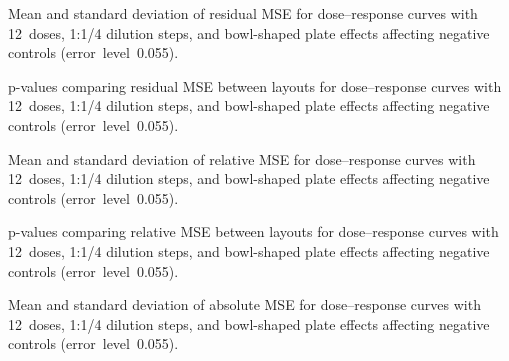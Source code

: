 \begin{table}[p]
    \centering
    \small
    
    \caption{Mean and standard deviation of residual MSE for dose--response curves with 12~doses, 1:1/4 dilution steps, and bowl-shaped plate effects affecting negative controls (error~level~0.055).}
    \label{tab:dr-residuals-mean-std-12doses-dil4-bowl-neg-controls-0.055}
\end{table}

\begin{table}[p]
    \centering
    \small
    
    \caption{p-values comparing residual MSE between layouts for dose--response curves with 12~doses, 1:1/4 dilution steps, and bowl-shaped plate effects affecting negative controls (error~level~0.055).}
    \label{tab:dr-residuals-pvalues-12doses-dil4-bowl-neg-controls-0.055}
\end{table}

\begin{table}[p]
    \centering
    \small
    
    \caption{Mean and standard deviation of relative \ECIC{} MSE for dose--response curves with 12~doses, 1:1/4 dilution steps, and bowl-shaped plate effects affecting negative controls (error~level~0.055).}
    \label{tab:dr-relic50-mean-std-12doses-dil4-bowl-neg-controls-0.055}
\end{table}

\begin{table}[p]
    \centering
    \small
    
    \caption{p-values comparing relative \ECIC{} MSE between layouts for dose--response curves with 12~doses, 1:1/4 dilution steps, and bowl-shaped plate effects affecting negative controls (error~level~0.055).}
    \label{tab:dr-relic50-pvalues-12doses-dil4-bowl-neg-controls-0.055}
\end{table}

\clearpage
\begin{table}[p]
    \centering
    \small
    
    \caption{Mean and standard deviation of absolute \ECIC{} MSE for dose--response curves with 12~doses, 1:1/4 dilution steps, and bowl-shaped plate effects affecting negative controls (error~level~0.055).}
    \label{tab:dr-absic50-mean-std-12doses-dil4-bowl-neg-controls-0.055}
\end{table}

